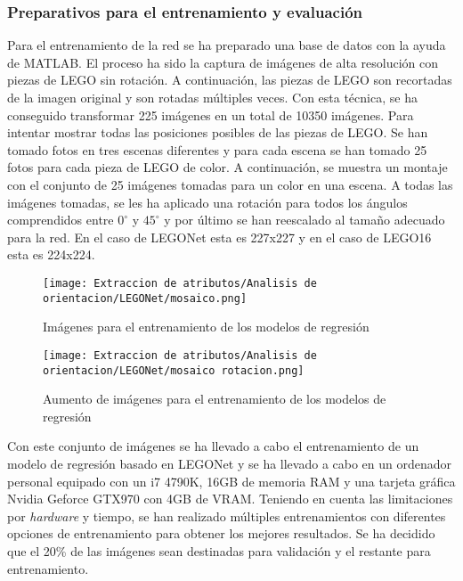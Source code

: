 \subsubsection*{Preparativos para el entrenamiento y evaluación}
Para el entrenamiento de la red se ha preparado una base de datos con la ayuda de MATLAB. El proceso ha sido la captura de imágenes de alta resolución con piezas de LEGO sin rotación. A continuación, las piezas de LEGO son recortadas de la imagen original y son rotadas múltiples veces. Con esta técnica, se ha conseguido transformar 225 imágenes en un total de 10350 imágenes. Para intentar mostrar todas las posiciones posibles de las piezas de LEGO. Se han tomado fotos en tres escenas diferentes y para cada escena se han tomado 25 fotos para cada pieza de LEGO de color. A continuación, se muestra un montaje con el conjunto de 25 imágenes tomadas para un color en una escena. A todas las imágenes tomadas, se les ha aplicado una rotación para todos los ángulos comprendidos entre $0^{\circ}$ y $45^{\circ}$ y por último se han reescalado al tamaño adecuado para la red. En el caso de LEGONet esta es 227x227 y en el caso de LEGO16 esta es 224x224.

\begin{figure}[ht]
	\centering
	\texttt{[image: Extraccion de atributos/Analisis de orientacion/LEGONet/mosaico.png]}
	\caption{Imágenes para el entrenamiento de los modelos de regresión}
	\label{fig:regresion LEGONet mosaico}
	\vspace{-5pt}
\end{figure}

\begin{figure}[ht]
	\centering
	\texttt{[image: Extraccion de atributos/Analisis de orientacion/LEGONet/mosaico rotacion.png]}
	\caption{Aumento de imágenes para el entrenamiento de los modelos de regresión}
	\label{fig:regresion LEGONet rotacion}
	\vspace{-5pt}
\end{figure}

Con este conjunto de imágenes se ha llevado a cabo el entrenamiento de un modelo de regresión basado en LEGONet y se ha llevado a cabo en un ordenador personal equipado con un i7 4790K, 16GB de memoria RAM y una tarjeta gráfica Nvidia Geforce GTX970 con 4GB de VRAM. Teniendo en cuenta las limitaciones por \textit{hardware} y tiempo, se han realizado múltiples entrenamientos con diferentes opciones de entrenamiento para obtener los mejores resultados. Se ha decidido que el 20\% de las imágenes sean destinadas para validación y el restante para entrenamiento.

